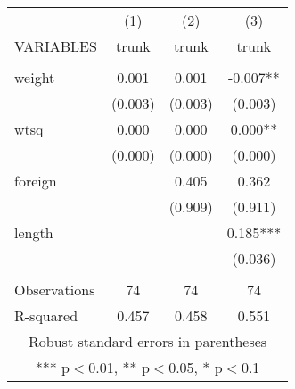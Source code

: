 \begin{tabular}{lccc} \hline
 & (1) & (2) & (3) \\
VARIABLES & trunk & trunk & trunk \\ \hline
 &  &  &  \\
weight & 0.001 & 0.001 & -0.007** \\
 & (0.003) & (0.003) & (0.003) \\
wtsq & 0.000 & 0.000 & 0.000** \\
 & (0.000) & (0.000) & (0.000) \\
foreign &  & 0.405 & 0.362 \\
 &  & (0.909) & (0.911) \\
length &  &  & 0.185*** \\
 &  &  & (0.036) \\
 &  &  &  \\
Observations & 74 & 74 & 74 \\
 R-squared & 0.457 & 0.458 & 0.551 \\ \hline
\multicolumn{4}{c}{ Robust standard errors in parentheses} \\
\multicolumn{4}{c}{ *** p$<$0.01, ** p$<$0.05, * p$<$0.1} \\
\end{tabular}
